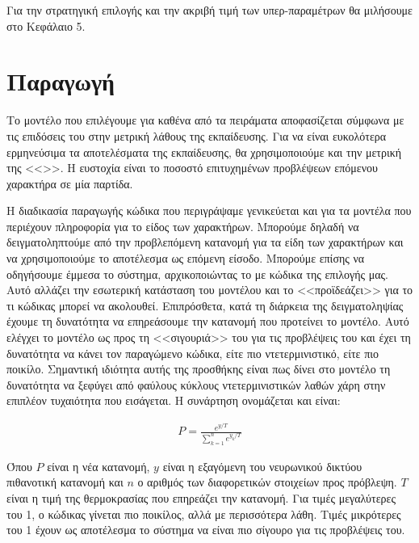 Για την στρατηγική επιλογής και την ακριβή τιμή των υπερ-παραμέτρων θα μιλήσουμε στο Κεφάλαιο 5.

\section{Παραγωγή}

Το μοντέλο που επιλέγουμε για καθένα από τα πειράματα αποφασίζεται σύμφωνα με τις επιδόσεις του στην μετρική λάθους της εκπαίδευσης.
Για να είναι ευκολότερα ερμηνεύσιμα τα αποτελέσματα της εκπαίδευσης, θα χρησιμοποιούμε και την μετρική της <<>>.
Η ευστοχία είναι το ποσοστό επιτυχημένων προβλέψεων επόμενου χαρακτήρα σε μία παρτίδα.

Η διαδικασία παραγωγής κώδικα που περιγράψαμε γενικεύεται και για τα μοντέλα που περιέχουν πληροφορία για το είδος των χαρακτήρων.
Μπορούμε δηλαδή να δειγματοληπτούμε από την προβλεπόμενη κατανομή για τα είδη των χαρακτήρων και να χρησιμοποιούμε το αποτέλεσμα ως επόμενη είσοδο.
Μπορούμε επίσης να οδηγήσουμε έμμεσα το σύστημα, αρχικοποιώντας το με κώδικα της επιλογής μας. Αυτό αλλάζει την εσωτερική κατάσταση του μοντέλου και το <<προϊδεάζει>> για το τι κώδικας μπορεί να ακολουθεί. 
Επιπρόσθετα, κατά τη διάρκεια της δειγματοληψίας έχουμε τη δυνατότητα να επηρεάσουμε την κατανομή που προτείνει το μοντέλο.
Αυτό ελέγχει το μοντέλο ως προς τη <<σιγουριά>> του για τις προβλέψεις του και έχει τη δυνατότητα να κάνει τον παραγώμενο κώδικα, είτε πιο ντετερμινιστικό, είτε πιο ποικίλο.
Σημαντική ιδιότητα αυτής της προσθήκης είναι πως δίνει στο μοντέλο τη δυνατότητα να ξεφύγει από φαύλους κύκλους ντετερμινιστικών λαθών χάρη στην επιπλέον τυχαιότητα που εισάγεται.
Η συνάρτηση ονομάζεται  και είναι: 

\begin{ceqn}
\begin{align}
P = \frac{e^{y/T}}{\sum_{k = 1}^{n} e^{y_k/T}}
\end{align}
\end{ceqn}

Όπου $P$ είναι η νέα κατανομή, $y$ είναι η εξαγόμενη του νευρωνικού δικτύου πιθανοτική κατανομή και $n$ ο αριθμός των διαφορετικών στοιχείων προς πρόβλεψη. $T$ είναι η τιμή της θερμοκρασίας που επηρεάζει την  κατανομή.
Για τιμές μεγαλύτερες του 1, ο κώδικας γίνεται πιο ποικίλος, αλλά με περισσότερα λάθη.
Τιμές μικρότερες του 1 έχουν ως αποτέλεσμα το σύστημα να είναι πιο σίγουρο για τις προβλέψεις του.



